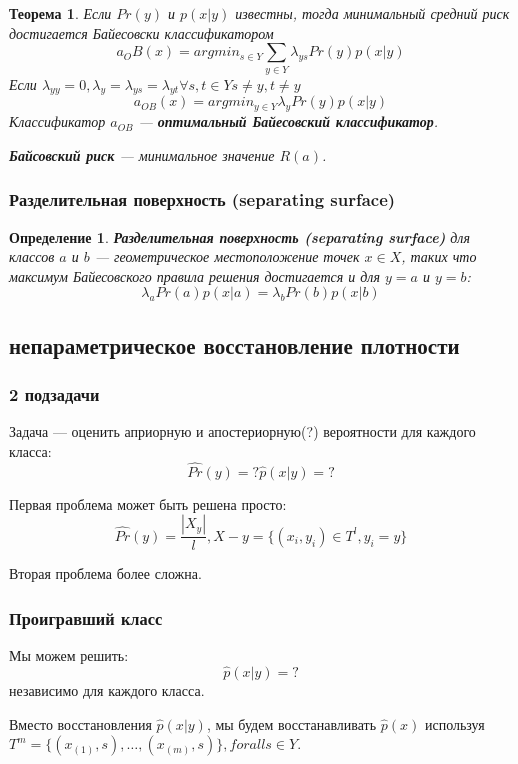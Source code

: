 \documentclass[10pt,a4paper,oneside,titlepage]{report}
\theoremstyle{defenition}
\newtheorem*{defenition}{Определение}
\theoremstyle{theorem}
\newtheorem*{theorem}{Теорема}
\begin{document}
\begin{theorem}
	Если $Pr(y)$ и $p(x|y)$ известны, тогда минимальный средний риск достигается Байесовски классификатором
	$$
	a_{O}B(x) = argmin_{s\in Y}\sum_{y\in Y}\lambda_{ys}Pr(y)p(x|y)
	$$
	Если $\lambda_{yy} = 0, \lambda_y = \lambda_{ys} = \lambda_{yt} \forall s, t \in Y s \ne y, t \ne y$
	$$
	a_{OB}(x) = argmin_{y\in Y}\lambda_yPr(y)p(x|y)
	$$
	Классификатор $a_{OB}$ --- {\bfseries оптимальный Байесовский классификатор}.
	
	{\bfseries Байсовский риск} --- минимальное значение $R(a)$.
\end{theorem}

\subsubsection{Разделительная поверхность (separating surface)}

\begin{defenition}
	{\bfseries Разделительная поверхность (separating surface)} для классов $a$ и $b$ --- геометрическое местоположение точек $x \in X$, таких что максимум Байесовского правила решения достигается и для $y = a$ и $y = b$:
	$$
	\lambda_aPr(a)p(x|a) = \lambda_bPr(b)p(x|b)
	$$
\end{defenition}

\subsection{непараметрическое восстановление плотности}

\subsubsection{2 подзадачи}

Задача --- оценить априорную и апостериорную(?) вероятности для каждого класса:
$$
\hat{Pr}(y) = ?
\hat{p}(x|y) = ?
$$

Первая проблема может быть решена просто:
$$
\hat{Pr}(y) = \frac{|X_y|}{l}, X-y = \{(x_i, y_i) \in T^l, y_i = y\}
$$

Вторая проблема более сложна.

\subsubsection{Проигравший класс}

Мы можем решить:
$$
\hat{p}(x|y) = ?
$$
независимо для каждого класса.

Вместо восстановления $\hat{p}(x|y)$, мы будем восстанавливать $\hat{p}(x)$ используя $T^m = \{(x_{(1)}, s), \ldots, (x_{(m)}, s)\}, for all s \in Y$.
\end{document}
